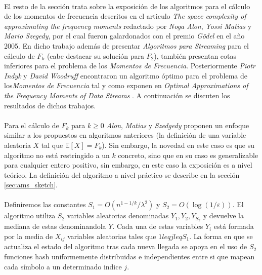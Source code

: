 \documentclass{subfiles}
\begin{document}
      \paragraph{}
      El resto de la sección trata sobre la exposición de los algoritmos para el cálculo de los momentos de frecuencia descritos en el articulo \emph{The space complexity of approximating the frequency moments} \cite{alon1996space} redactado por \emph{Noga Alon}, \emph{Yossi Matias} y \emph{Mario Szegedy}, por el cual fueron galardonados con el premio \emph{Gödel} en el año 2005. En dicho trabajo además de presentar \emph{Algoritmos para Streaming} para el cálculo de $F_k$ (cabe destacar su solución para $F_2$), también presentan cotas inferiores para el problema de los \emph{Momentos de Frecuencia}. Posteriormente \emph{Piotr Indyk} y \emph{David Woodruff} encontraron un algoritmo óptimo para el problema de los\emph{Momentos de Frecuencia} tal y como exponen en \emph{Optimal Approximations of the Frequency Moments of Data Streams} \cite{indyk2005optimal}. A continuación se discuten los resultados de dichos trabajos.

      \paragraph{}
      Para el cálculo de $F_k$ para $k \geq 0$ \emph{Alon}, \emph{Matias} y \emph{Szedgedy} proponen un enfoque similar a los propuestos en algoritmos anteriores (la definición de una variable aleatoria $X$ tal que $\mathbb{E}[X] = F_k$). Sin embargo, la novedad en este caso es que su algoritmo no está restringido a un $k$ concreto, sino que en su caso es generalizable para cualquier entero positivo, sin embargo, en este caso la exposición es a nivel teórico. La definición del algoritmo a nivel práctico se describe en la sección \ref{sec:ams_sketch}.

      \paragraph{}
      Definiremos las constantes $S_1 =O(n^{1-1/k}/\lambda ^{2})$ y $S_2 = O(\log(1/\varepsilon ))$. El algoritmo utiliza $S_2$ variables aleatorias denominadas $Y_1, Y_2, Y_{S_2}$ y devuelve la mediana de estas denominandola $Y$. Cada una de estas variables $Y_i$ está formada por la media de $X_{ij}$ variables aleatorias tales que $1 leq j leq S_1$. La forma en que se actualiza el estado del algoritmo tras cada nueva llegada se apoya en el uso de $S_2$ funciones hash uniformemente distribuidas e independientes entre si que mapean cada símbolo a un determinado indice $j$.
\end{document}
